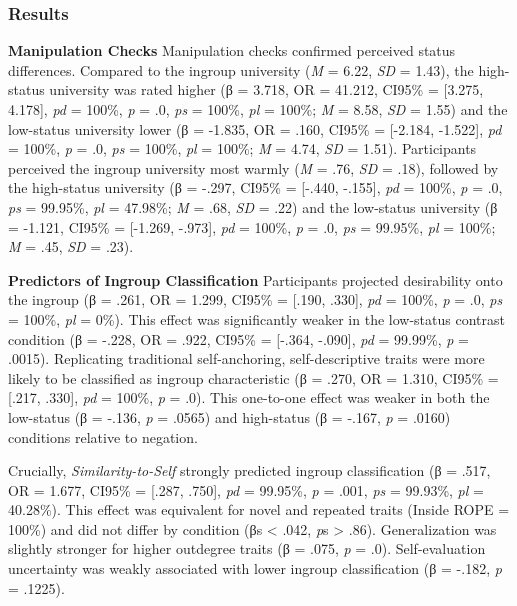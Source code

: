 \documentclass[
  man,
  longtable,
  nolmodern,
  notxfonts,
  notimes,
  man]{apa7}
\begin{document}
\subsubsection{Results}\label{results-1}

\textbf{Manipulation Checks} Manipulation checks confirmed perceived
status differences. Compared to the ingroup university (\emph{M} = 6.22,
\emph{SD} = 1.43), the high-status university was rated higher (β =
3.718, OR = 41.212, CI95\% = {[}3.275, 4.178{]}, \emph{pd} = 100\%,
\emph{p} = .0, \emph{ps} = 100\%, \emph{pl} = 100\%; \emph{M} = 8.58,
\emph{SD} = 1.55) and the low-status university lower (β = -1.835, OR =
.160, CI95\% = {[}-2.184, -1.522{]}, \emph{pd} = 100\%, \emph{p} = .0,
\emph{ps} = 100\%, \emph{pl} = 100\%; \emph{M} = 4.74, \emph{SD} =
1.51). Participants perceived the ingroup university most warmly
(\emph{M} = .76, \emph{SD} = .18), followed by the high-status
university (β = -.297, CI95\% = {[}-.440, -.155{]}, \emph{pd} = 100\%,
\emph{p} = .0, \emph{ps} = 99.95\%, \emph{pl} = 47.98\%; \emph{M} = .68,
\emph{SD} = .22) and the low-status university (β = -1.121, CI95\% =
{[}-1.269, -.973{]}, \emph{pd} = 100\%, \emph{p} = .0, \emph{ps} =
99.95\%, \emph{pl} = 100\%; \emph{M} = .45, \emph{SD} = .23).

\textbf{Predictors of Ingroup Classification} Participants projected
desirability onto the ingroup (β = .261, OR = 1.299, CI95\% = {[}.190,
.330{]}, \emph{pd} = 100\%, \emph{p} = .0, \emph{ps} = 100\%, \emph{pl}
= 0\%). This effect was significantly weaker in the low-status contrast
condition (β = -.228, OR = .922, CI95\% = {[}-.364, -.090{]}, \emph{pd}
= 99.99\%, \emph{p} = .0015). Replicating traditional self-anchoring,
self-descriptive traits were more likely to be classified as ingroup
characteristic (β = .270, OR = 1.310, CI95\% = {[}.217, .330{]},
\emph{pd} = 100\%, \emph{p} = .0). This one-to-one effect was weaker in
both the low-status (β = -.136, \emph{p} = .0565) and high-status (β =
-.167, \emph{p} = .0160) conditions relative to negation.

Crucially, \emph{Similarity-to-Self} strongly predicted ingroup
classification (β = .517, OR = 1.677, CI95\% = {[}.287, .750{]},
\emph{pd} = 99.95\%, \emph{p} = .001, \emph{ps} = 99.93\%, \emph{pl} =
40.28\%). This effect was equivalent for novel and repeated traits
(Inside ROPE = 100\%) and did not differ by condition (βs \textless{}
.042, \emph{p}s \textgreater{} .86). Generalization was slightly
stronger for higher outdegree traits (β = .075, \emph{p} = .0).
Self-evaluation uncertainty was weakly associated with lower ingroup
classification (β = -.182, \emph{p} = .1225).
\end{document}
